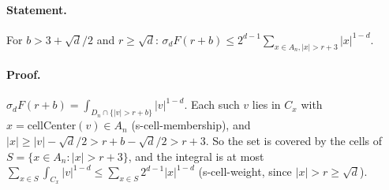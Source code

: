 \paragraph{Statement.} For $b>3+\sqrt d/2$ and $r\geq\sqrt d$: $\sigma_dF(r+b)\leq2^{d-1}\sum_{x\in A_n,|x|>r+3}|x|^{1-d}$.
\paragraph{Proof.} $\sigma_dF(r+b)=\int_{D_n\cap\{|v|>r+b\}}|v|^{1-d}$. Each such $v$ lies in $C_x$ with $x=\mathrm{cellCenter}(v)\in A_n$ (s-cell-membership), and
$|x|\geq|v|-\sqrt d/2>r+b-\sqrt d/2>r+3$. So the set is covered by the cells of $S=\{x\in A_n:|x|>r+3\}$, and the integral is at most
$\sum_{x\in S}\int_{C_x}|v|^{1-d}\leq\sum_{x\in S}2^{d-1}|x|^{1-d}$ (s-cell-weight, since $|x|>r\geq\sqrt d$).
